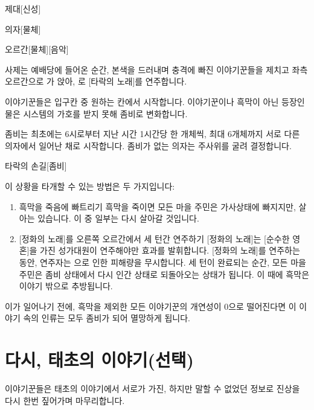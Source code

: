 \documentclass{report}
\begin{document}
		\begin{spoiler}{제대}{[신성]}
		\end{spoiler}
		
		\begin{spoiler}{의자}{[물체]}
		\end{spoiler}
		
		\begin{spoiler}{오르간}{[물체][음악]}
		\end{spoiler}
		
		사제는 예배당에 들어온 순간, 본색을 드러내며 충격에 빠진 이야기꾼들을 제치고 좌측 오르간으로 가 앉아, 로 [타락의 노래]를 연주합니다.
		
		이야기꾼들은 입구칸 중 원하는 칸에서 시작합니다. 이야기꾼이나 흑막이 아닌 등장인물은 시스템의 가호를 받지 못해 좀비로 변화합니다.
		
		좀비는 최초에는 6시로부터 지난 시간 1시간당 한 개체씩, 최대 6개체까지 서로 다른 의자에서 일어난 채로 시작합니다. 좀비가 없는 의자는 주사위를 굴려 결정합니다.
		
		\begin{spoiler}{타락의 손길}{[좀비]}
			
			
		\end{spoiler}
		
		이 상황을 타개할 수 있는 방법은 두 가지입니다:
		\begin{enumerate}
			\item 흑막을 죽음에 빠트리기
				\subitem{$\rightarrow$} 흑막을 죽이면 모든 마을 주민은 가사상태에 빠지지만, 살아는 있습니다. 이 중 일부는 다시 살아갈 것입니다.
			\item{} [정화의 노래]를 오른쪽 오르간에서 세 턴간 연주하기
				\subitem{$\rightarrow$} [정화의 노래]는 [순수한 영혼]을 가진 성가대원이 연주해야만 효과를 발휘합니다. [정화의 노래]를 연주하는 동안, 연주자는 으로 인한 피해량을 무시합니다. 세 턴이 완료되는 순간, 모든 마을 주민은 좀비 상태에서 다시 인간 상태로 되돌아오는 상태가 됩니다. 이 때에 흑막은 이야기 밖으로 추방됩니다.
		\end{enumerate}
		
		이가 일어나기 전에, 흑막을 제외한 모든 이야기꾼의 개연성이 0으로 떨어진다면 이 이야기 속의 인류는 모두 좀비가 되어 멸망하게 됩니다.
	
	\section{다시, 태초의 이야기(선택)}
		이야기꾼들은 태초의 이야기에서 서로가 가진, 하지만 말할 수 없었던 정보로 진상을 다시 한번 짚어가며 마무리합니다.
	
\end{document}
